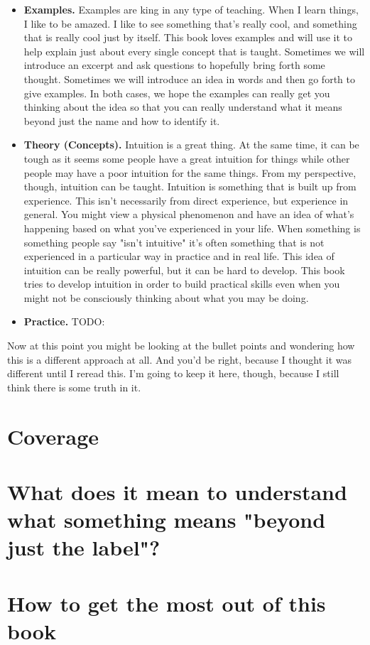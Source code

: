 \documentclass[../OpenAppliedMusicTheory.tex]{subfiles}
\begin{document}
    \begin{itemize}
        \item \textbf{Examples.} Examples are king in any type of teaching. When I learn things, I like to be amazed. I like to see something that's really cool, and something that is really cool just by itself. This book loves examples and will use it to help explain just about every single concept that is taught. Sometimes we will introduce an excerpt and ask questions to hopefully bring forth some thought. Sometimes we will introduce an idea in words and then go forth to give examples. In both cases, we hope the examples can really get you thinking about the idea so that you can really understand what it means beyond just the name and how to identify it.
        \item \textbf{Theory (Concepts).} Intuition is a great thing. At the same time, it can be tough as it seems some people have a great intuition for things while other people may have a poor intuition for the same things. From my perspective, though, intuition can be taught. Intuition is something that is built up from experience. This isn't necessarily from direct experience, but experience in general. You might view a physical phenomenon and have an idea of what's happening based on what you've experienced in your life. When something is something people say "isn't intuitive" it's often something that is not experienced in a particular way in practice and in real life. This idea of intuition can be really powerful, but it can be hard to develop. This book tries to develop intuition in order to build practical skills even when you might not be consciously thinking about what you may be doing.
        \item \textbf{Practice.} TODO:
    \end{itemize}

    Now at this point you might be looking at the bullet points and wondering how this is a different approach at all. And you'd be right, because I thought it was different until I reread this. I'm going to keep it here, though, because I still think there is some truth in it. %

    \section*{Coverage}

    \section*{What does it mean to understand what something means "beyond just the label"?}

    \section*{How to get the most out of this book}
\end{document}
